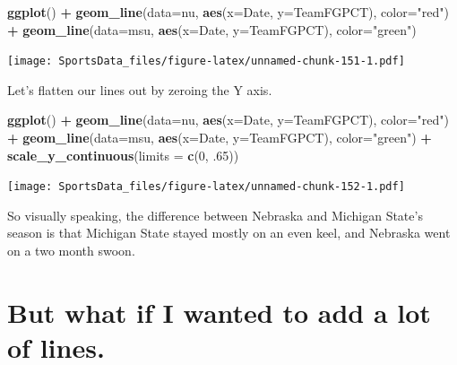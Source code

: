 \documentclass[
]{book}
\newenvironment{Shaded}{\begin{snugshade}}{\end{snugshade}}
\newcommand{\DataTypeTok}[1]{\textcolor[rgb]{0.13,0.29,0.53}{#1}}
\newcommand{\DecValTok}[1]{\textcolor[rgb]{0.00,0.00,0.81}{#1}}
\newcommand{\FloatTok}[1]{\textcolor[rgb]{0.00,0.00,0.81}{#1}}
\newcommand{\KeywordTok}[1]{\textcolor[rgb]{0.13,0.29,0.53}{\textbf{#1}}}
\newcommand{\NormalTok}[1]{#1}
\newcommand{\OperatorTok}[1]{\textcolor[rgb]{0.81,0.36,0.00}{\textbf{#1}}}
\newcommand{\StringTok}[1]{\textcolor[rgb]{0.31,0.60,0.02}{#1}}
\begin{document}
\begin{Shaded}
\begin{Highlighting}[]
\KeywordTok{ggplot}\NormalTok{() }\OperatorTok{+}\StringTok{ }\KeywordTok{geom_line}\NormalTok{(}\DataTypeTok{data=}\NormalTok{nu, }\KeywordTok{aes}\NormalTok{(}\DataTypeTok{x=}\NormalTok{Date, }\DataTypeTok{y=}\NormalTok{TeamFGPCT), }\DataTypeTok{color=}\StringTok{"red"}\NormalTok{) }\OperatorTok{+}\StringTok{ }\KeywordTok{geom_line}\NormalTok{(}\DataTypeTok{data=}\NormalTok{msu, }\KeywordTok{aes}\NormalTok{(}\DataTypeTok{x=}\NormalTok{Date, }\DataTypeTok{y=}\NormalTok{TeamFGPCT), }\DataTypeTok{color=}\StringTok{"green"}\NormalTok{)}
\end{Highlighting}
\end{Shaded}

\texttt{[image: SportsData\_files/figure-latex/unnamed-chunk-151-1.pdf]}

Let's flatten our lines out by zeroing the Y axis.

\begin{Shaded}
\begin{Highlighting}[]
\KeywordTok{ggplot}\NormalTok{() }\OperatorTok{+}\StringTok{ }\KeywordTok{geom_line}\NormalTok{(}\DataTypeTok{data=}\NormalTok{nu, }\KeywordTok{aes}\NormalTok{(}\DataTypeTok{x=}\NormalTok{Date, }\DataTypeTok{y=}\NormalTok{TeamFGPCT), }\DataTypeTok{color=}\StringTok{"red"}\NormalTok{) }\OperatorTok{+}\StringTok{ }\KeywordTok{geom_line}\NormalTok{(}\DataTypeTok{data=}\NormalTok{msu, }\KeywordTok{aes}\NormalTok{(}\DataTypeTok{x=}\NormalTok{Date, }\DataTypeTok{y=}\NormalTok{TeamFGPCT), }\DataTypeTok{color=}\StringTok{"green"}\NormalTok{) }\OperatorTok{+}\StringTok{ }\KeywordTok{scale_y_continuous}\NormalTok{(}\DataTypeTok{limits =} \KeywordTok{c}\NormalTok{(}\DecValTok{0}\NormalTok{, }\FloatTok{.65}\NormalTok{))}
\end{Highlighting}
\end{Shaded}

\texttt{[image: SportsData\_files/figure-latex/unnamed-chunk-152-1.pdf]}

So visually speaking, the difference between Nebraska and Michigan State's season is that Michigan State stayed mostly on an even keel, and Nebraska went on a two month swoon.

\hypertarget{but-what-if-i-wanted-to-add-a-lot-of-lines.}{%
\section{But what if I wanted to add a lot of lines.}\label{but-what-if-i-wanted-to-add-a-lot-of-lines.}}
\end{document}
